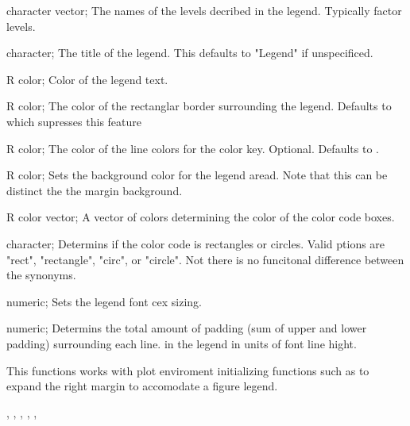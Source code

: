 \documentclass[a4paper]{book}
\begin{document}
\begin{Arguments}
\begin{ldescription}
\item[\code{labels}] character vector; The names of the levels decribed in the legend. Typically factor levels.

\item[\code{title}] character; The title of the legend. This defaults to "Legend" if unspecificed.

\item[\code{fontCol}] R color; Color of the legend text.

\item[\code{border}] R color; The color of the rectanglar border surrounding the legend. Defaults to  which supresses this feature

\item[\code{lineCol}] R color; The color of the line colors for the color key. Optional. Defaults to .

\item[\code{bg}] R color; Sets the background color for the legend aread. Note that this can be distinct the the margin background.

\item[\code{col}] R color vector; A vector of colors determining the color of the color code boxes.

\item[\code{shape}] character; Determins if the color code is rectangles or circles. Valid ptions are "rect", "rectangle", "circ", or "circle". Not there is no funcitonal difference between the synonyms.

\item[\code{size}] numeric; Sets the legend font cex sizing.

\item[\code{spacing}] numeric; Determins the total amount of padding (sum of upper and lower padding) surrounding each line. in the legend in units of font line hight.
\end{ldescription}
\end{Arguments}
%
\begin{Details}\relax
This functions works with plot enviroment initializing functions such as 
to expand the right margin to accomodate a figure legend.
\end{Details}
%
\begin{SeeAlso}\relax
{}, , , , , 
\end{SeeAlso}
\end{document}
